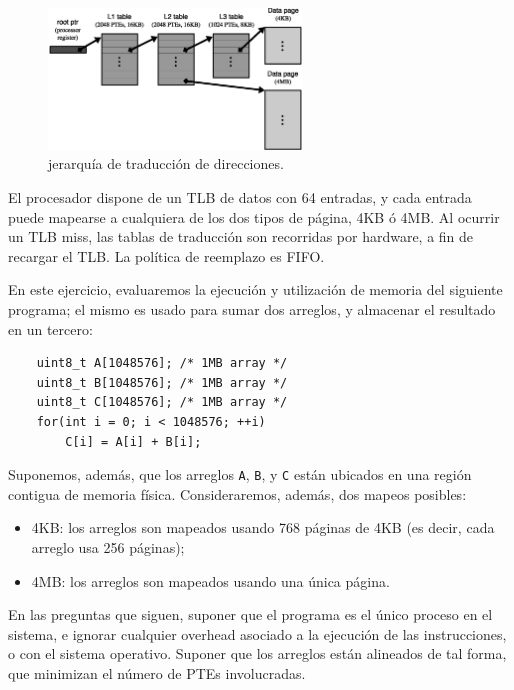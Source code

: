     \begin{figure}[!ht]
    \centering
    \includegraphics[width=0.6\textwidth]{./gfx/ptes.eps}
    \caption{jerarquía de traducción de direcciones.}
    \label{fig::hier}
    \end{figure}

    El procesador dispone de un TLB de datos con 64 entradas, y cada 
    entrada puede mapearse a cualquiera de los dos tipos de página, 4KB ó
    4MB. Al ocurrir un TLB miss, las tablas de traducción son recorridas
    por hardware, a fin de recargar el TLB. La política de reemplazo es
    FIFO.

    En este ejercicio, evaluaremos la ejecución y utilización de memoria
    del siguiente programa; el mismo es usado para sumar dos arreglos, y
    almacenar el resultado en un tercero:

    \begin{small}
    \begin{verbatim}
	uint8_t A[1048576]; /* 1MB array */
	uint8_t B[1048576]; /* 1MB array */
	uint8_t C[1048576]; /* 1MB array */
	for(int i = 0; i < 1048576; ++i)
		C[i] = A[i] + B[i];
    \end{verbatim}
    \end{small}

    Suponemos, además, que los arreglos \verb|A|, \verb|B|, y \verb|C| 
    están ubicados en una región contigua de memoria física. 
    Consideraremos, además, dos mapeos posibles:

    \begin{itemize}
    \item	4KB: los arreglos son mapeados usando 768 páginas de 4KB (es
	    decir, cada arreglo usa 256 páginas);

    \item	4MB: los arreglos son mapeados usando una única página.
    \end{itemize}

    En las preguntas que siguen, suponer que el programa es el único 
    proceso en el sistema, e ignorar cualquier overhead asociado a la
    ejecución de las instrucciones, o con el sistema operativo. Suponer
    que los arreglos están alineados de tal forma, que minimizan el
    número de PTEs involucradas.

